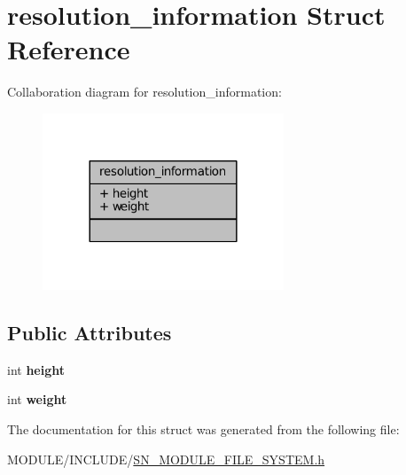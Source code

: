 \hypertarget{structresolution__information}{}\section{resolution\+\_\+information Struct Reference}
\label{structresolution__information}


Collaboration diagram for resolution\+\_\+information\+:\nopagebreak
\begin{figure}[H]
\begin{center}
\leavevmode
\includegraphics[width=204pt]{structresolution__information__coll__graph}
\end{center}
\end{figure}
\subsection*{Public Attributes}
\begin{DoxyCompactItemize}
\item 
\mbox{\label{structresolution__information_a8d1c7315902a529455c57a7322b5a496}} 
int {\bfseries height}
\item 
\mbox{\label{structresolution__information_a2512e4a0b84a869f2dbb6fbcff5142cc}} 
int {\bfseries weight}
\end{DoxyCompactItemize}


The documentation for this struct was generated from the following file\+:\begin{DoxyCompactItemize}
\item 
M\+O\+D\+U\+L\+E/\+I\+N\+C\+L\+U\+D\+E/\hyperlink{SN__MODULE__FILE__SYSTEM_8h}{S\+N\+\_\+\+M\+O\+D\+U\+L\+E\+\_\+\+F\+I\+L\+E\+\_\+\+S\+Y\+S\+T\+E\+M.\+h}\end{DoxyCompactItemize}
